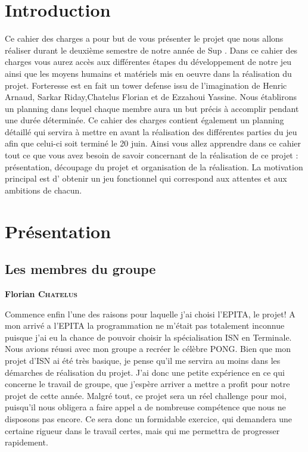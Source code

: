 \documentclass[a4paper, 12pt]{article}
\begin{document}
\section{Introduction}
Ce cahier des charges a pour but de vous présenter le projet que nous allons réaliser durant le deuxième semestre de notre année de Sup . Dans ce cahier des charges vous aurez accès aux différentes étapes du développement de notre jeu ainsi que les moyens humains et matériels mis en oeuvre dans la réalisation du projet.
Forteresse est en fait un tower defense issu de l’imagination de Henric Arnaud, Sarkar Riday,Chatelus Florian et de Ezzahoui Yassine.
Nous établirons un planning dans lequel chaque membre aura un but précis à accomplir pendant une durée déterminée.
Ce cahier des charges contient également un planning détaillé qui servira à mettre en avant  la réalisation des différentes parties du jeu afin que celui-ci soit terminé le 20 juin.
Ainsi vous allez  apprendre  dans ce cahier tout ce que vous avez besoin de savoir concernant de la réalisation de ce projet : présentation, découpage du projet et organisation de la réalisation.
La motivation principal est  d’ obtenir un jeu fonctionnel qui correspond aux attentes  et aux ambitions de chacun.


\section{Présentation}
	\subsection{Les membres du groupe}
	\parindent=0cm\textbf{Florian \textsc{Chatelus}}
	\smallbreak
	\par \parindent=0.5cm Commence enfin l'une des raisons pour laquelle j'ai choisi l'EPITA, le projet! A mon arrivé a l'EPITA la programmation ne m'était pas totalement inconnue puisque j'ai eu la chance de pouvoir choisir la spécialisation ISN en Terminale. Nous avions réussi avec mon groupe a recréer le célèbre PONG. Bien que mon projet d'ISN ai été très basique, je pense qu'il me servira au moins dans les démarches de réalisation du projet. J'ai donc une petite expérience en ce qui concerne le travail de groupe, que j'espère arriver a mettre a profit pour notre projet de cette année. Malgré tout, ce projet sera un réel challenge pour moi, puisqu'il nous obligera a faire appel a de nombreuse compétence que nous ne disposons pas encore. Ce sera donc un formidable exercice, qui demandera une certaine rigueur dans le travail certes, mais qui me permettra de progresser rapidement.\\
	
\end{document}
